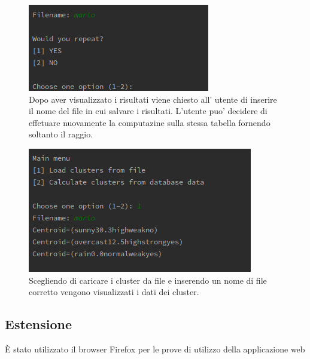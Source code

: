 \documentclass{article}
\begin{document}
        \begin{figure}[H]
            \includegraphics{BASE4}
            \caption{Dopo aver visualizzato i risultati viene chiesto all'
            utente di inserire il nome del file in cui salvare i risultati. L'utente
             puo' decidere di effetuare nuovamente la computazine sulla
            stessa tabella fornendo soltanto il raggio.}   
            \label{fig:3}
        \end{figure}


        \begin{figure}[H]
            \includegraphics{BASE5}
            \caption{Scegliendo di caricare i cluster da file e inserendo un 
            nome di file corretto vengono visualizzati i dati dei cluster.}   
            \label{fig:4}
        \end{figure} 
        \FloatBarrier
       

    \subsection{Estensione}
    È stato utilizzato il browser Firefox per le prove di utilizzo della 
    applicazione web
\end{document}
